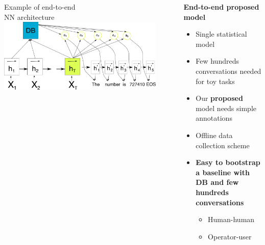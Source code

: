 \documentclass[10pt, compress,british,xcolor={svgnames,dvipsnames,x11names},trans]{beamer}
\begin{document}
\begin{frame}
\begin{columns}
\begin{column}{0.2\textwidth}
            \vfill
        \begin{center} 
            {\tiny Example of end-to-end \\ NN architecture}
            \includegraphics[width=0.9\textwidth]{./encdecdb.pdf} 
        \end{center}
\end{column}
\begin{column}{0.45\textwidth}
    {\bf End-to-end proposed model}
    \begin{itemize}
        \item Single statistical model
        \item Few hundreds conversations needed for toy tasks~\cite{wen_networkbased_2016}
        \item Our {\bf proposed} model needs simple annotations
        \item {\color{darkgreen} Offline data collection scheme}~\cite{wen_networkbased_2016,platek2016wochat}
        \item {\bf \color{darkgreen} Easy to bootstrap a baseline with DB and few hundreds conversations}
            \begin{itemize}
                \item \color{darkgreen} Human-human 
                \item \color{darkgreen} Operator-user
            \end{itemize}
    \end{itemize}
\end{column}
\end{columns}
\end{frame}
\end{document}
